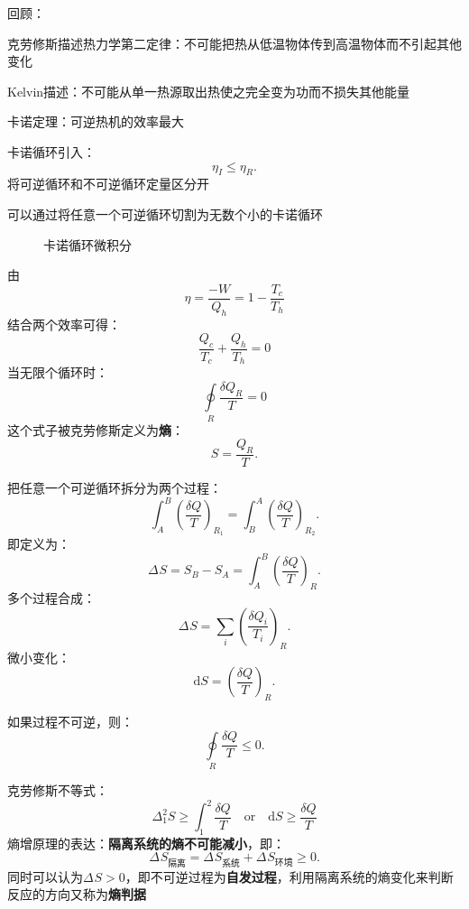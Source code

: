 回顾：
\begin{notation}
    克劳修斯描述热力学第二定律：不可能把热从低温物体传到高温物体而不引起其他变化

    Kelvin描述：不可能从单一热源取出热使之完全变为功而不损失其他能量
\end{notation}
\begin{notation}
    卡诺定理：可逆热机的效率最大
\end{notation}
卡诺循环引入：\[
    \eta_{I} \le \eta_R
.\]
将可逆循环和不可逆循环定量区分开
\begin{notation}
可以通过将任意一个可逆循环切割为无数个小的卡诺循环
\end{notation}
\begin{figure}[ht!]
    \centering
    \caption{卡诺循环微积分}
    \label{fig:卡诺循环微积分}
\end{figure}
由\begin{equation}
    \label{eq:nwq}
    \eta = \frac{-W}{Q_{h}} = 1-\frac{T_c}{T_{h}}
\end{equation}
结合两个效率可得：
\begin{equation}
    \label{eq:qt}
    \frac{Q_c}{T_c} + \frac{Q_{h}}{T_{h}} = 0
\end{equation}
当无限个循环时：\begin{equation}
    \label{eq:ointqt}
    \oint\limits_{R} {\frac{\delta Q_R}{T}} = 0
\end{equation}
这个式子被克劳修斯定义为\textbf{熵}：
\[
    S = \frac{Q_R}{T}
.\]
\begin{eg}
    把任意一个可逆循环拆分为两个过程：\[
        \int_{A}^{B} \left(\frac{\delta Q}{T}\right)_{R_1} = \int_{B}^{A} \left(\frac{\delta Q}{T}\right)_{R_2}
    .\]
    即定义为：\[
        \Delta_\text{}S = S_{B} -S_A = \int_{A}^{B} \left(\frac{\delta Q}{T}\right)_{R}
    .\]
    多个过程合成：\[
        \Delta_\text{}S = \sum_{i}\left(\frac{\delta Q_{i}}{T_{i}}\right)_{R}
    .\]
    微小变化：\[
        \mathrm{d}S = \left(\frac{\delta Q}{T}\right)_{R}
    .\]
\end{eg}
如果过程不可逆，则：\[
    \oint\limits_{R} {\frac{\delta Q}{T}} \le 0
.\]
\begin{notation}
    克劳修斯不等式：\begin{equation}
        \label{eq:cla}
        \Delta_1^2 S \ge \int_{1}^{2} \frac{\delta Q}{T}\quad \text{or}\quad \mathrm{d}S \ge \frac{\delta Q}{T}
    \end{equation}
    熵增原理的表达：\textbf{隔离系统的熵不可能减小}，即：\[
        \Delta_\text{}S_{\text{隔离}} = \Delta_\text{}S_{\text{系统}} + \Delta_\text{}S_{\text{环境}} \ge 0
    .\]
    同时可以认为$\Delta_\text{}S > 0 $，即不可逆过程为\textbf{自发过程}，利用隔离系统的熵变化来判断反应的方向又称为\textbf{熵判据}
\end{notation}
